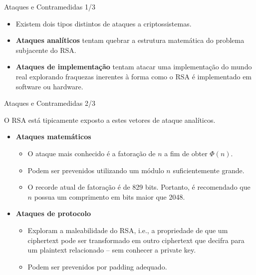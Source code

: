 \documentclass{beamer}
\begin{document}
\begin{frame}{Ataques e Contramedidas 1/3}

\begin{itemize}
    \item Existem dois tipos distintos de ataques a criptossistemas.
    \vspace{0.5em}
    \item \textbf{Ataques analíticos} tentam quebrar a estrutura matemática do problema subjacente do RSA.
    \vspace{0.5em}
    \item \textbf{Ataques de implementação} tentam atacar uma implementação do mundo real explorando fraquezas inerentes à forma como o RSA é implementado em software ou hardware.
\end{itemize}

\end{frame}

\begin{frame}{Ataques e Contramedidas 2/3}

O RSA está tipicamente exposto a estes vetores de ataque analíticos.

\begin{itemize}
    \item \textbf{Ataques matemáticos}
    \begin{itemize}
        \item O ataque mais conhecido é a fatoração de $n$ a fim de obter $\Phi(n)$.
        \item Podem ser prevenidos utilizando um módulo $n$ suficientemente grande.
        \item O recorde atual de fatoração é de 829 bits. Portanto, é recomendado que $n$ possua um comprimento em bits maior que 2048.
    \end{itemize}
    \item \textbf{Ataques de protocolo}
    \begin{itemize}
        \item Exploram a maleabilidade do RSA, i.e., a propriedade de que um ciphertext pode ser transformado em outro ciphertext que decifra para um plaintext relacionado – sem conhecer a private key.
        \item Podem ser prevenidos por padding adequado.
    \end{itemize}
\end{itemize}

\end{frame}
\end{document}
